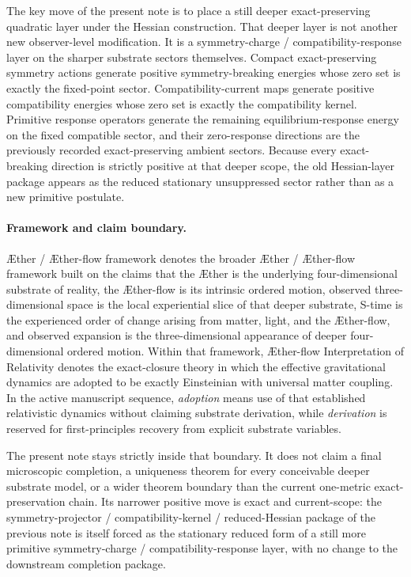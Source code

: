 \documentclass[11pt]{article}
\newcommand{\Aether}{\AE{}ther}
\newcommand{\Aflow}{\AE{}ther-flow}
\newcommand{\TheoryName}{\Aflow{} Interpretation of Relativity}
\newcommand{\TheoryProgram}{\Aether{} / \Aflow{} framework}
\begin{document}
The key move of the present note is to place a still deeper exact-preserving quadratic layer under the Hessian construction. That deeper layer is not another new observer-level modification. It is a symmetry-charge / compatibility-response layer on the sharper substrate sectors themselves. Compact exact-preserving symmetry actions generate positive symmetry-breaking energies whose zero set is exactly the fixed-point sector. Compatibility-current maps generate positive compatibility energies whose zero set is exactly the compatibility kernel. Primitive response operators generate the remaining equilibrium-response energy on the fixed compatible sector, and their zero-response directions are the previously recorded exact-preserving ambient sectors. Because every exact-breaking direction is strictly positive at that deeper scope, the old Hessian-layer package appears as the reduced stationary unsuppressed sector rather than as a new primitive postulate.

\paragraph{Framework and claim boundary.}
\TheoryProgram{} denotes the broader \Aether{} / \Aflow{} framework built on the claims that the \Aether{} is the underlying four-dimensional substrate of reality, the \Aflow{} is its intrinsic ordered motion, observed three-dimensional space is the local experiential slice of that deeper substrate, S-time is the experienced order of change arising from matter, light, and the \Aflow{}, and observed expansion is the three-dimensional appearance of deeper four-dimensional ordered motion. Within that framework, \TheoryName{} denotes the exact-closure theory in which the effective gravitational dynamics are adopted to be exactly Einsteinian with universal matter coupling. In the active manuscript sequence, \emph{adoption} means use of that established relativistic dynamics without claiming substrate derivation, while \emph{derivation} is reserved for first-principles recovery from explicit substrate variables.

The present note stays strictly inside that boundary. It does not claim a final microscopic completion, a uniqueness theorem for every conceivable deeper substrate model, or a wider theorem boundary than the current one-metric exact-preservation chain. Its narrower positive move is exact and current-scope: the symmetry-projector / compatibility-kernel / reduced-Hessian package of the previous note is itself forced as the stationary reduced form of a still more primitive symmetry-charge / compatibility-response layer, with no change to the downstream completion package.
\end{document}
